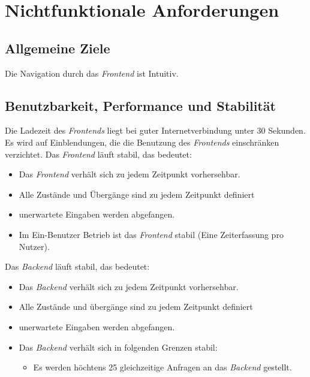 \section{Nichtfunktionale Anforderungen}

\subsection{Allgemeine Ziele}
\begin{requirements}
     Die Navigation durch das \emph{Frontend} ist Intuitiv.
\end{requirements}

\subsection{Benutzbarkeit, Performance und Stabilität}
\begin{requirements}
     Die Ladezeit des \emph{Frontends} liegt bei guter Internetverbindung unter 30 Sekunden.
     Es wird auf Einblendungen, die die Benutzung des \emph{Frontends} einschränken verzichtet.
     Das \emph{Frontend} läuft stabil, das bedeutet:
     \begin{itemize}
        \item Das \emph{Frontend} verhält sich zu jedem Zeitpunkt vorhersehbar.
        \item Alle Zustände und Übergänge sind zu jedem Zeitpunkt definiert
        \item unerwartete Eingaben werden abgefangen.
        \item Im Ein-Benutzer Betrieb ist das \emph{Frontend} stabil (Eine Zeiterfassung pro Nutzer).
     \end{itemize}
      Das \emph{Backend} läuft stabil, das bedeutet:
          \begin{itemize}
             \item Das \emph{Backend} verhält sich zu jedem Zeitpunkt vorhersehbar.
             \item Alle Zustände und übergänge sind zu jedem Zeitpunkt definiert
             \item unerwartete Eingaben werden abgefangen.
             \item Das \emph{Backend} verhält sich in folgenden Grenzen stabil:
             \begin{itemize}
                 \item Es werden höchtens 25 gleichzeitige Anfragen an das \emph{Backend} gestellt.
             \end{itemize}
          \end{itemize}
\end{requirements}


